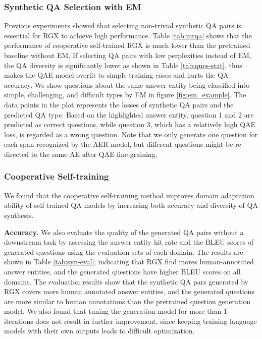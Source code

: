 \documentclass[11pt,a4paper]{article}
\begin{document}
\subsubsection{Synthetic QA Selection with EM}
Previous experiments showed that selecting non-trivial synthetic QA pairs is essential for RGX to achieve high performance. Table \ref{tab:mrqa} shows that the performance of cooperative self-trained RGX is much lower than the pretrained baseline without EM. If selecting QA pairs with low perplexities instead of EM, the QA diversity is significantly lower as shown in Table \ref{tab:ques-stat}, thus makes the QAE model overfit to simple training cases and hurts the QA accuracy. We show questions about the same answer entity being classified into simple, challenging, and difficult types by EM in figure \ref{fig:em_example}. The data points in the plot represents the losses of synthetic QA pairs and the predicted QA type. Based on the highlighted answer entity, question 1 and 2 are predicted as correct questions, while question 3, which has a relatively high QAE loss, is regarded as a wrong question. Note that we only generate one question for each span recognized by the AER model, but different questions might be re-directed to the same AE after QAE fine-graining.

\subsubsection{Cooperative Self-training}
We found that the cooperative self-training method improves domain adaptation ability of self-trained QA models by increasing both accuracy and diversity of QA synthesis.

\noindent \textbf{Accuracy.} We also evaluate the quality of the generated QA pairs without a downstream task by assessing the answer entity hit rate and the BLEU scores of generated questions using the evaluation sets of each domain. The results are shown in Table \ref{tab:syn-eval}, indicating that RGX find mores human-annotated answer entities, and the generated questions have higher BLEU scores on all domains. The evaluation results show that the synthetic QA pars generated by RGX covers more human annotated answer entities, and the generated questions are more similar to human annotations than the pretrained question generation model. We also found that tuning the generation model for more than 1 iterations does not result in further improvement, since keeping training language models with their own outputs leads to difficult optimization.
\end{document}
